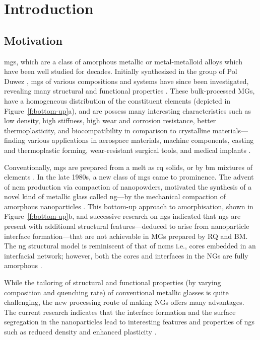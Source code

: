 \chapter{Introduction} \label{c:intro}

\section{Motivation}
\glspl{mg}, which are a class of amorphous metallic or metal-metalloid alloys which have been well studied for decades. Initially synthesized in the group of Pol Duwez \cite{Klement1960}, \gls{mg}s of various compositions and systems 
have since been investigated, revealing many structural and functional properties \cite{Greer1995,Suryanarayana2001,Trexler2010,Berthier2016}. These bulk-processed MGs, have a homogeneous distribution of the constituent elements (depicted in Figure~\ref{f:bottom-up}a), and are possess many interesting characteristics such as low density, high stiffness, high wear and corrosion resistance, better thermoplasticity, and biocompatibility in comparison to crystalline materials---finding various applications in aerospace materials, machine components, casting and thermoplastic forming, wear-resistant surgical tools, and medical implants \cite{Johnson2002,Nu2016}. \par

Conventionally, \glspl{mg} are prepared from a melt as \gls{rq} solids, or by \gls{bm} mixtures of elements \cite{Klement1960,Weeber1988,Duwez1960,Greer1995}. In the late 1980s, a new class of \gls{mg}s came to prominence. The advent of \gls{ncm} production via compaction of nanopowders, motivated the synthesis of a novel kind of metallic 
glass called \gls{ng}---by the mechanical compaction of amorphous nanoparticles \cite{Jing1989,Gleiter2014}. This bottom-up approach to amorphisation, shown in Figure~\ref{f:bottom-up}b, and successive research on \gls{ng}s 
\cite{Gleiter2014,Ivanisenko2018,Fang2012,Ghafari2012,Weissmuller1992,Gleiter2016,Witte2013} indicated that \glspl{ng} are present with additional structural features---deduced to arise from nanoparticle interface formation---that are not achievable in MGs prepared by RQ and BM. The \gls{ng} structural model is reminiscent of that of \gls{ncm}s i.e., cores embedded in an interfacial network; however, both the cores and interfaces in the NGs are fully amorphous \cite{Ivanisenko2018,Nandam2017,Sopu2009,Adjaoud2018,Cheng2019}. \par

While the tailoring of structural and functional properties (by varying composition and quenching rate) of conventional metallic glasses is quite challenging, the new processing route of making NGs offers many advantages. The current research indicates that the interface formation and the surface segregation in the nanoparticles lead to interesting features and properties of \gls{ng}s such as reduced density and enhanced plasticity \cite{Adjaoud2016,Adjaoud2018,Ritter2011,Nandam2017,Wang2017,Wang2018,Nandam2020,Nandam2021}.
  \par

